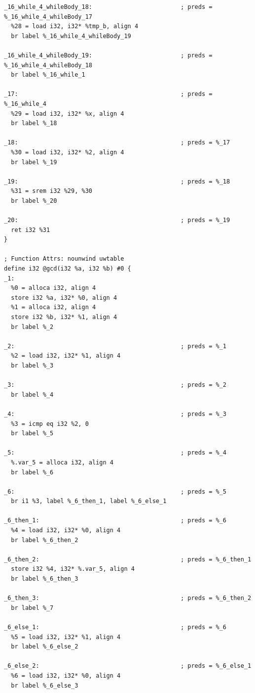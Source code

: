 \documentclass[12pt,a4paper]{article}
\begin{document}
\begin{verbatim}
_16_while_4_whileBody_18:                         ; preds = %_16_while_4_whileBody_17
  %28 = load i32, i32* %tmp_b, align 4
  br label %_16_while_4_whileBody_19

_16_while_4_whileBody_19:                         ; preds = %_16_while_4_whileBody_18
  br label %_16_while_1

_17:                                              ; preds = %_16_while_4
  %29 = load i32, i32* %x, align 4
  br label %_18

_18:                                              ; preds = %_17
  %30 = load i32, i32* %2, align 4
  br label %_19

_19:                                              ; preds = %_18
  %31 = srem i32 %29, %30
  br label %_20

_20:                                              ; preds = %_19
  ret i32 %31
}

; Function Attrs: nounwind uwtable
define i32 @gcd(i32 %a, i32 %b) #0 {
_1:
  %0 = alloca i32, align 4
  store i32 %a, i32* %0, align 4
  %1 = alloca i32, align 4
  store i32 %b, i32* %1, align 4
  br label %_2

_2:                                               ; preds = %_1
  %2 = load i32, i32* %1, align 4
  br label %_3

_3:                                               ; preds = %_2
  br label %_4

_4:                                               ; preds = %_3
  %3 = icmp eq i32 %2, 0
  br label %_5

_5:                                               ; preds = %_4
  %.var_5 = alloca i32, align 4
  br label %_6

_6:                                               ; preds = %_5
  br i1 %3, label %_6_then_1, label %_6_else_1

_6_then_1:                                        ; preds = %_6
  %4 = load i32, i32* %0, align 4
  br label %_6_then_2

_6_then_2:                                        ; preds = %_6_then_1
  store i32 %4, i32* %.var_5, align 4
  br label %_6_then_3

_6_then_3:                                        ; preds = %_6_then_2
  br label %_7

_6_else_1:                                        ; preds = %_6
  %5 = load i32, i32* %1, align 4
  br label %_6_else_2

_6_else_2:                                        ; preds = %_6_else_1
  %6 = load i32, i32* %0, align 4
  br label %_6_else_3


\end{verbatim}
\end{document}
